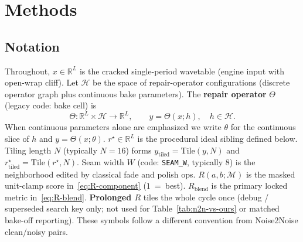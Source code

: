 \section{Methods}
\label{sec:methods}

\subsection{Notation}
\label{sec:notation}

Throughout, $x\in\mathbb{R}^{L}$ is the cracked single-period wavetable (engine input with open-wrap cliff).
Let $\mathcal{H}$ be the space of repair-operator configurations (discrete operator graph plus continuous bake parameters).
The \textbf{repair operator} $\Theta$ (legacy code: bake cell) is
\begin{equation}
\label{eq:Theta}
\Theta:\mathbb{R}^{L}\times\mathcal{H}\to\mathbb{R}^{L},\qquad
y=\Theta(x;h),\quad h\in\mathcal{H}.
\end{equation}
When continuous parameters alone are emphasized we write $\theta$ for the continuous slice of $h$ and $y=\Theta(x;\theta)$.
$r^{\star}\in\mathbb{R}^{L}$ is the procedural ideal sibling defined below.
Tiling length $N$ (typically $N{=}16$) forms $y_{\mathrm{tiled}}=\mathrm{Tile}(y,N)$ and $r^{\star}_{\mathrm{tiled}}=\mathrm{Tile}(r^{\star},N)$.
Seam width $W$ (code: \texttt{SEAM\_W}, typically $8$) is the neighborhood edited by classical fade and polish ops.
$R(a,b;\mathcal{M})$ is the masked unit-clamp score in~\eqref{eq:R-component} ($1$~=~best).
$R_{\mathrm{blend}}$ is the primary locked metric in~\eqref{eq:R-blend}.
\textbf{Prolonged $R$} tiles the whole cycle once (debug / superseded search key only; not used for Table~\ref{tab:n2n-vs-ours} or matched bake-off reporting).
These symbols follow a different convention from Noise2Noise clean/noisy pairs.


